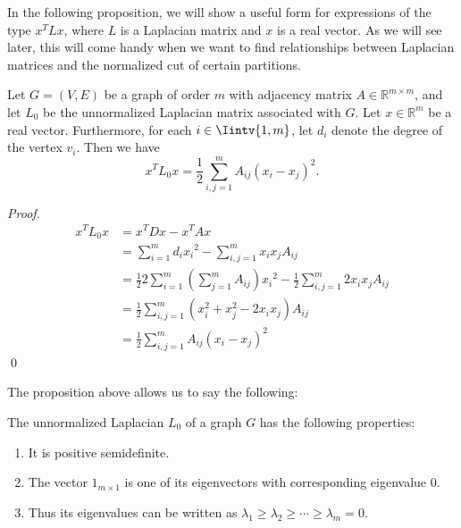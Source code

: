 In the following proposition, we will show a useful form for expressions of the type $x^TLx$, where $L$ is a Laplacian matrix and $x$ is a real vector.
As we will see later, this will come handy when we want to find relationships between Laplacian matrices and the normalized cut of certain partitions.

\begin{proposition}\label{xtlx}
   Let $G = (V,E)$ be a graph of order $m$ with adjacency matrix $A \in \mathbb R^{m \times m}$, and let $L_0$ be the unnormalized Laplacian matrix associated with $G$. Let $x \in \mathbb R^{m }$ be a real vector. Furthermore, for each $i \in \Iintv{1,m}$, let $d_i$ denote the degree of the vertex $v_i$. Then we have
   \begin{equation}
      x^TL_0x = \frac{1}{2}\sum_{i,j = 1}^m A_{ij} \left( x_i - x_j \right)^2.
   \end{equation}
\end{proposition}

\begin{proof}
   \begin{equation*} 
      \begin{split}
         x^TL_0x &= x^TDx - x^TAx \\
         &= \sum_{i=1}^m d_i{x_i}^2 - \sum_{i,j = 1}^m x_i  x_j A_{ij}  \\
         &= \frac{1}{2} 2 \sum_{i=1}^m \left( \sum_{j=1}^mA_{ij} \right){x_i}^2 - \frac{1}{2}\sum_{i,j = 1}^m 2x_i  x_j A_{ij}  \\
         &= \frac{1}{2} \sum_{i,j=1}^m (x_i^2 +x_j^2 - 2x_ix_j)A_{ij} \\
         &= \frac{1}{2} \sum_{i,j=1}^m A_{ij} \left( x_i - x_j \right) ^2
      \end{split}
   \end{equation*} \qed
\end{proof}

The proposition above allows us to say the following:

\begin{corollary}\label{unnormalizedLaplacianProperties}
   The unnormalized Laplacian $L_0$ of a graph $G$ has the following properties:
   \begin{enumerate}
      \item It is positive semidefinite.
      \item The vector $1_{m \times 1}$ is one of its eigenvectors with corresponding eigenvalue $0$.
      \item Thus its eigenvalues can be written as $\lambda_1 \ge \lambda_2 \ge \cdots \ge \lambda_m = 0$.
   \end{enumerate}
\end{corollary}

